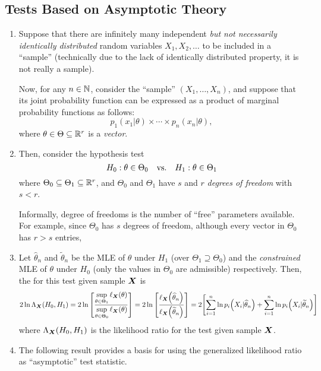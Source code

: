 \subsection{Tests Based on Asymptotic Theory}
\begin{enumerate}
\item Suppose that there are infinitely many independent \emph{but not
necessarily identically distributed} random variables \(X_1,X_2,\dotsc\) to be
included in a ``sample'' (technically due to the lack of identically
distributed property, it is not really a sample).

Now, for any \(n\in\mathbb{N}\), consider the ``sample'' \((X_1,\dotsc,X_n)\), and
suppose that its joint probability function can be expressed as a product of
marginal probability functions as follows:
\[
p_1(x_1|\theta)\times\dotsb\times p_n(x_n|\theta),
\]
where \(\theta\in\Theta\subseteq\mathbb{R}^r\) is a \emph{vector}.
\item Then, consider the hypothesis test
\[
H_0:\theta\in\Theta_0\qqtext{vs.}H_1:\theta\in\Theta_1
\]
where \(\Theta_0\subseteq\Theta_1\subseteq\mathbb{R}^r\), and \(\Theta_0\) and \(\Theta_1\)
have \(s\) and \(r\) \emph{degrees of freedom} with \(s<r\).

\begin{note}
Informally, degree of freedoms is the number of ``free'' parameters available.
For example, since \(\Theta_0\) has \(s\) degrees of freedom, although every
vector in \(\Theta_0\) has \(r>s\) entries, 
\end{note}

\item Let \(\widehat{\theta}_n\) and \(\widetilde{\theta}_n\) be the MLE of
\(\theta\) under \(H_1\) (over \(\Theta_1\supseteq\Theta_0\)) and the \emph{constrained} MLE of
\(\theta\) under \(H_0\) (only the values in \(\Theta_0\) are admissible)
respectively. Then, the  for this test given
sample \(\vb*{X}\) is
\[
2\ln\Lambda_{\vb*{X}}(H_0, H_1)=
2\ln\qty[\frac{\displaystyle \sup_{\theta\in\Theta_1}\ell_{\vb*{X}}\qty(\theta)}
{\displaystyle \sup_{\theta\in\Theta_0}\ell_{\vb*{X}}\qty(\theta)}]
=2\ln\qty[\frac{\ell_{\vb*{X}}\qty(\widehat{\theta}_n)}{\ell_{\vb*{X}}\qty(\widetilde{\theta}_n)}]
=2\qty[\sum_{i=1}^{n}\ln p_i\qty(X_i|\widehat{\theta}_n)
+\sum_{i=1}^{n}\ln p_i\qty(X_i|\widetilde{\theta}_n)]
\]
where \(\Lambda_{\vb*{X}}(H_0, H_1)\) is the likelihood ratio for the test
given sample \(\vb*{X}\).

\item The following result provides a basis for using the generalized
likelihood ratio as ``asymptotic'' test statistic.


\end{enumerate}
